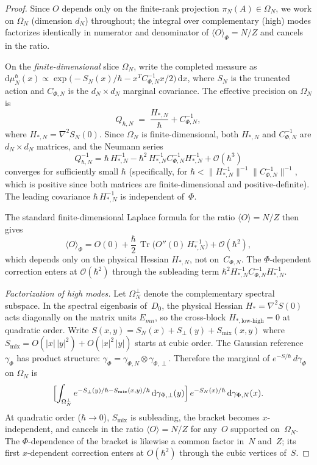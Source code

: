 \documentclass[12pt,a4paper]{article}
\theoremstyle{plain}
\theoremstyle{definition}
\theoremstyle{remark}
\newcommand{\dd}{\mathrm{d}}
\newcommand{\Tr}{\operatorname{Tr}}
\newcommand{\order}{\mathcal{O}}
\begin{document}
\begin{proof}
Since $O$ depends only on the finite-rank projection
$\pi_N(A) \in \Omega_N$, we work on $\Omega_N$ (dimension $d_N$)
throughout; the integral over complementary (high) modes
factorizes identically in numerator and denominator of
$\langle O\rangle_\Phi = N/Z$ and cancels in the ratio.

On the \emph{finite-dimensional} slice $\Omega_N$, write the
completed measure as
$\dd\mu_N^\hbar(x) \propto \exp\bigl(-S_N(x)/\hbar
- x^T C_{\Phi,N}^{-1} x/2\bigr)\,\dd x$,
where $S_N$ is the truncated action and $C_{\Phi,N}$ is the
$d_N \times d_N$ marginal covariance.  The effective precision
on $\Omega_N$ is
\[
  Q_{\hbar,N} \;=\; \frac{H_{*,N}}{\hbar} + C_{\Phi,N}^{-1},
\]
where $H_{*,N} = \nabla^2 S_N(0)$.  Since $\Omega_N$ is
finite-dimensional, both $H_{*,N}$ and $C_{\Phi,N}^{-1}$ are
$d_N \times d_N$ matrices, and the Neumann series
\[
  Q_{\hbar,N}^{-1}
  = \hbar\,H_{*,N}^{-1}
  - \hbar^2\,H_{*,N}^{-1}C_{\Phi,N}^{-1}H_{*,N}^{-1}
  + \order(\hbar^3)
\]
converges for sufficiently small $\hbar$ (specifically, for
$\hbar < \|H_{*,N}^{-1}\|^{-1}\|C_{\Phi,N}^{-1}\|^{-1}$, which is
positive since both matrices are finite-dimensional and
positive-definite).  The leading covariance
$\hbar\,H_{*,N}^{-1}$ is independent of~$\Phi$.

The standard finite-dimensional Laplace formula for the ratio
$\langle O\rangle = N/Z$ then gives
\[
  \langle O\rangle_\Phi
  = O(0) + \frac{\hbar}{2}\,\Tr\bigl(O''(0)\,H_{*,N}^{-1}\bigr)
  + \order(\hbar^2),
\]
which depends only on the physical Hessian $H_{*,N}$, not
on~$C_{\Phi,N}$.  The $\Phi$-dependent correction enters at
$\order(\hbar^2)$ through the subleading term
$\hbar^2 H_{*,N}^{-1}C_{\Phi,N}^{-1}H_{*,N}^{-1}$.

\emph{Factorization of high modes.}
Let $\Omega_N^\perp$ denote the complementary spectral subspace.
In the spectral eigenbasis of~$D_0$, the physical Hessian
$H_* = \nabla^2 S(0)$ acts diagonally on the matrix units
$E_{mn}$, so the cross-block $H_{*,\mathrm{low\text{-}high}} = 0$
at quadratic order.
Write $S(x,y) = S_N(x) + S_\perp(y) + S_{\mathrm{mix}}(x,y)$
where $S_{\mathrm{mix}} = O(|x|\,|y|^2) + O(|x|^2\,|y|)$ starts at
cubic order.  The Gaussian reference $\gamma_\Phi$ has product
structure: $\gamma_\Phi = \gamma_{\Phi,N}\otimes\gamma_{\Phi,\perp}$.
Therefore the marginal of
$e^{-S/\hbar}\,d\gamma_\Phi$ on $\Omega_N$ is
\[
  \Bigl[\int_{\Omega_N^\perp} e^{-S_\perp(y)/\hbar
  - S_{\mathrm{mix}}(x,y)/\hbar}\,
  \dd\gamma_{\Phi,\perp}(y)\Bigr]\,
  e^{-S_N(x)/\hbar}\,\dd\gamma_{\Phi,N}(x).
\]
At quadratic order ($\hbar \to 0$), $S_{\mathrm{mix}}$ is subleading,
the bracket becomes $x$-independent, and cancels in the ratio
$\langle O\rangle = N/Z$
for any~$O$ supported on~$\Omega_N$.
The $\Phi$-dependence of the bracket is likewise a common
factor in~$N$ and~$Z$; its first $x$-dependent correction enters at
$O(\hbar^2)$ through the cubic vertices of~$S$.
\end{proof}
\end{document}
